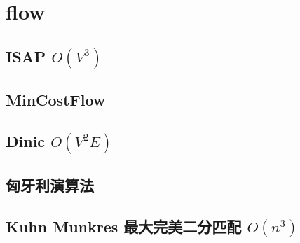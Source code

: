 \documentclass[a4paper,10pt,twocolumn,oneside]{article}
\begin{document}
\section{flow}

\subsection{ISAP $O(V^{3})$}


\subsection{MinCostFlow}


\subsection{Dinic $O(V^{2}E)$}


\subsection{匈牙利演算法}


%

\subsection{Kuhn Munkres 最大完美二分匹配 $O(n^{3})$}


%

%

% 
\end{document}

